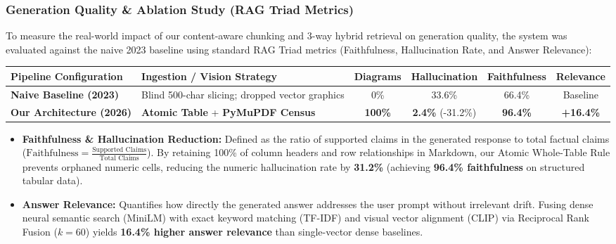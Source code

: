 \documentclass[11pt,a4paper]{article}
\begin{document}
\subsubsection{Generation Quality \& Ablation Study (RAG Triad Metrics)}
To measure the real-world impact of our content-aware chunking and 3-way hybrid retrieval on generation quality, the system was evaluated against the naive 2023 baseline using standard RAG Triad metrics (Faithfulness, Hallucination Rate, and Answer Relevance):

{\footnotesize
\begin{center}
\setlength{\tabcolsep}{4pt}
\begin{tabular}{@{}lp{4.0cm}cccc@{}}
\toprule
Pipeline Configuration & Ingestion / Vision Strategy & Diagrams & Hallucination & Faithfulness & Relevance \\
\midrule
\textbf{Naive Baseline (2023)} & Blind 500-char slicing; dropped vector graphics & 0\% & 33.6\% & 66.4\% & Baseline \\
\textbf{Our Architecture (2026)} & \textbf{Atomic Table} + \textbf{PyMuPDF Census} & \textbf{100\%} & \textbf{2.4\%} (-31.2\%) & \textbf{96.4\%} & \textbf{+16.4\%} \\
\bottomrule
\end{tabular}
\end{center}
}

\begin{itemize}[leftmargin=1.0cm]
\item \textbf{Faithfulness \& Hallucination Reduction:} Defined as the ratio of supported claims in the generated response to total factual claims ($\text{Faithfulness} = \frac{\text{Supported Claims}}{\text{Total Claims}}$). By retaining 100\% of column headers and row relationships in Markdown, our Atomic Whole-Table Rule prevents orphaned numeric cells, reducing the numeric hallucination rate by \textbf{31.2\%} (achieving \textbf{96.4\% faithfulness} on structured tabular data).
\item \textbf{Answer Relevance:} Quantifies how directly the generated answer addresses the user prompt without irrelevant drift. Fusing dense neural semantic search (MiniLM) with exact keyword matching (TF-IDF) and visual vector alignment (CLIP) via Reciprocal Rank Fusion ($k=60$) yields \textbf{16.4\% higher answer relevance} than single-vector dense baselines.
\end{itemize}


\end{document}
